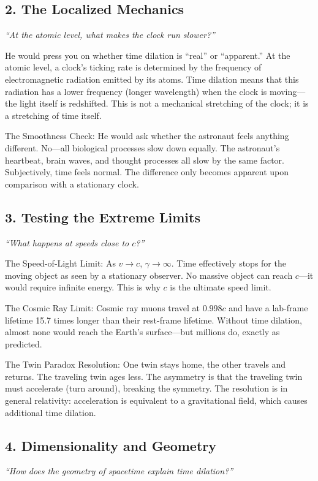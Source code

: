 \subsection*{2. The Localized Mechanics}
\textit{``At the atomic level, what makes the clock run slower?''}

He would press you on whether time dilation is ``real'' or ``apparent.'' At the atomic level, a clock's ticking rate is determined by the frequency of electromagnetic radiation emitted by its atoms. Time dilation means that this radiation has a lower frequency (longer wavelength) when the clock is moving---the light itself is redshifted. This is not a mechanical stretching of the clock; it is a stretching of time itself.

The Smoothness Check: He would ask whether the astronaut feels anything different. No---all biological processes slow down equally. The astronaut's heartbeat, brain waves, and thought processes all slow by the same factor. Subjectively, time feels normal. The difference only becomes apparent upon comparison with a stationary clock.

\subsection*{3. Testing the Extreme Limits}
\textit{``What happens at speeds close to $c$?''}

The Speed-of-Light Limit: As $v \to c$, $\gamma \to \infty$. Time effectively stops for the moving object as seen by a stationary observer. No massive object can reach $c$---it would require infinite energy. This is why $c$ is the ultimate speed limit.

The Cosmic Ray Limit: Cosmic ray muons travel at 0.998$c$ and have a lab-frame lifetime 15.7 times longer than their rest-frame lifetime. Without time dilation, almost none would reach the Earth's surface---but millions do, exactly as predicted.

The Twin Paradox Resolution: One twin stays home, the other travels and returns. The traveling twin ages less. The asymmetry is that the traveling twin must accelerate (turn around), breaking the symmetry. The resolution is in general relativity: acceleration is equivalent to a gravitational field, which causes additional time dilation.

\subsection*{4. Dimensionality and Geometry}
\textit{``How does the geometry of spacetime explain time dilation?''}

